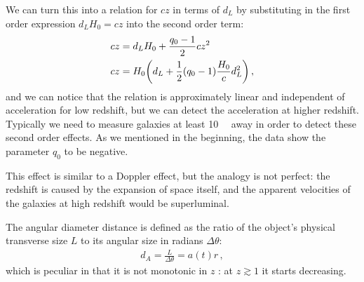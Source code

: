 \documentclass[main.tex]{subfiles}
\begin{document}
We can turn this into a relation for \(cz\) in terms of \(d_L\) by substituting in the first order expression \(d_L H_0 = cz\) into the second order term:
\begin{align}
cz &= d_L H_0 + \frac{q_0 -1}{2} cz^2 \\
cz &= H_0 \qty(d_L + \frac{1}{2} (q_0 -1 ) \frac{H_0}{c} d_L^2)\,,
\end{align}
%
and we can notice that the relation is approximately linear and independent of acceleration for low redshift, but we can detect the acceleration at higher redshift.
Typically we need to measure galaxies at least \SI{10}{\mega\parsec} away in order to detect these second order effects.
As we mentioned in the beginning, the data show the parameter \(q_0 \) to be negative.

This effect is similar to a Doppler effect, but the analogy is not perfect: the redshift is caused by the expansion of space itself, and the apparent velocities of the galaxies at high redshift would be superluminal. 


\begin{definition}
The angular diameter distance is defined as the ratio of the object's physical transverse size \(L\) to its angular size in radians \(\Delta \theta \): 
%
\begin{align}
d_A = \frac{L}{\Delta \theta } = a(t) r
\,,
\end{align}
%
which is peculiar in that it is not monotonic in \(z\) \cite{hoggDistanceMeasuresCosmology2000}: at \(z \gtrsim 1\) it starts decreasing.
\end{definition}

\end{document}
